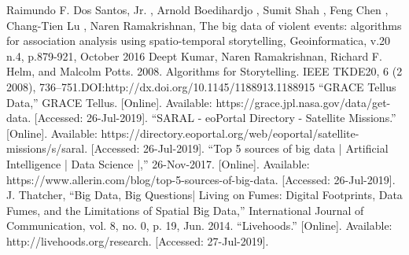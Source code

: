 \documentclass[conference]{IEEEtran}
\begin{document}
\begin{thebibliography}{12}
\bibitem {} Raimundo F. Dos Santos, Jr. , Arnold Boedihardjo , Sumit Shah , Feng Chen , Chang-Tien Lu , Naren Ramakrishnan, The big data of violent events: algorithms for association analysis using spatio-temporal storytelling, Geoinformatica, v.20 n.4, p.879-921, October 2016
\bibitem {} Deept Kumar, Naren Ramakrishnan, Richard F. Helm, and Malcolm Potts. 2008. Algorithms for Storytelling. IEEE TKDE20, 6 (2 2008), 736–751.DOI:http://dx.doi.org/10.1145/1188913.1188915
\bibitem {} “GRACE Tellus Data,” GRACE Tellus. [Online]. Available: https://grace.jpl.nasa.gov/data/get-data. [Accessed: 26-Jul-2019].
\bibitem {} “SARAL - eoPortal Directory - Satellite Missions.” [Online]. Available: https://directory.eoportal.org/web/eoportal/satellite-missions/s/saral. [Accessed: 26-Jul-2019].
\bibitem {} “Top 5 sources of big data | Artificial Intelligence | Data Science |,” 26-Nov-2017. [Online]. Available: https://www.allerin.com/blog/top-5-sources-of-big-data. [Accessed: 26-Jul-2019].
\bibitem {} J. Thatcher, “Big Data, Big Questions| Living on Fumes: Digital Footprints, Data Fumes, and the Limitations of Spatial Big Data,” International Journal of Communication, vol. 8, no. 0, p. 19, Jun. 2014.
\bibitem {} “Livehoods.” [Online]. Available: http://livehoods.org/research. [Accessed: 27-Jul-2019].

\end{thebibliography}
\end{document}
